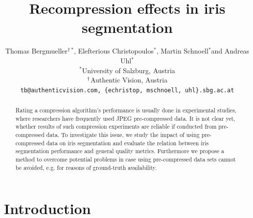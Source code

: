 \documentclass[10pt,twocolumn,letterpaper]{article}
\newcommand{\superscript}[1]{\ensuremath{^{\textrm{#1}}}}
\def\wu{\superscript{*}}
\def\wg{\superscript{\dag}}
\begin{document}
\title{Recompression effects in iris segmentation}

\author{Thomas Bergmueller\wg\wu, Elefterious Christopoulos\wu, Martin Schnoell\wu and Andreas Uhl\wu \\
\wu University of Salzburg, Austria \\
\wg Authentic Vision, Austria\\
{\tt\small tb@authenticvision.com, \{echristop, mschnoell, uhl\}\@cosy.sbg.ac.at}
}





\maketitle
\thispagestyle{empty}

\begin{abstract}
	
	Rating a compression algorithm's
	performance is usually done in experimental studies, where researchers have frequently used JPEG pre-compressed data. It is not clear yet,
	whether results of such compression experiments are reliable if conducted from pre-compressed data. 
	To investigate this issue, we study the impact of using pre-compressed data on iris segmentation and evaluate the relation between iris segmentation 
	performance and general quality metrics. Furthermore we propose a method to overcome potential problems in case using
	pre-compressed data sets cannot be avoided, e.g. for reasons of ground-truth availability.
\end{abstract}

\section{Introduction}
\end{document}

